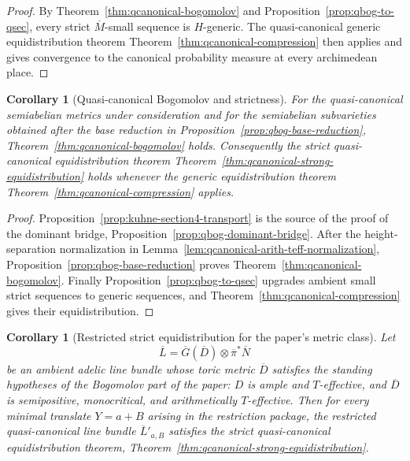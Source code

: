 \documentclass[10pt,a4paper]{amsart}
\theoremstyle{plain}
\newtheorem{corollary}[theorem]{Corollary}
\theoremstyle{plain}
\numberwithin{equation}{section}
\providecommand{\bD}{\overline{D}}
\providecommand{\bL}{\overline{L}}
\providecommand{\bN}{\overline{N}}
\providecommand{\bM}{\overline{M}}
\begin{document}
\begin{proof}
	By Theorem~\ref{thm:qcanonical-bogomolov} and
	Proposition~\ref{prop:qbog-to-qsec}, every strict \(\bM\)-small sequence is
	\(H\)-generic.  The quasi-canonical generic equidistribution theorem
	Theorem~\ref{thm:qcanonical-compression} then applies and gives convergence to
	the canonical probability measure at every archimedean place.
\end{proof}

\begin{corollary}[Quasi-canonical Bogomolov and strictness]
	\label{cor:kuhne-transport-qbog-qsec}
	For the quasi-canonical semiabelian metrics under consideration and for the
	semiabelian subvarieties obtained after the base reduction in
	Proposition~\ref{prop:qbog-base-reduction},
	Theorem~\ref{thm:qcanonical-bogomolov} holds.  Consequently the strict
	quasi-canonical equidistribution theorem
	Theorem~\ref{thm:qcanonical-strong-equidistribution} holds whenever the
	generic equidistribution theorem Theorem~\ref{thm:qcanonical-compression}
	applies.
\end{corollary}

\begin{proof}
	Proposition~\ref{prop:kuhne-section4-transport} is the source of the proof of
	the dominant bridge, Proposition~\ref{prop:qbog-dominant-bridge}.  After the
	height-separation normalization in
	Lemma~\ref{lem:qcanonical-arith-teff-normalization},
	Proposition~\ref{prop:qbog-base-reduction} proves
	Theorem~\ref{thm:qcanonical-bogomolov}.  Finally
	Proposition~\ref{prop:qbog-to-qsec} upgrades ambient small strict sequences to
	generic sequences, and Theorem~\ref{thm:qcanonical-compression} gives their
	equidistribution.
\end{proof}

\begin{corollary}[Restricted strict equidistribution for the paper's metric class]
	\label{cor:kuhne-transport-paper-metric-class}
	Let
	\[
	\bL=\overline G(\bD)\otimes\overline\pi^*\bN
	\]
	be an ambient adelic line bundle whose toric metric \(\bD\) satisfies the
	standing hypotheses of the Bogomolov part of the paper:
	\(D\) is ample and \(T\)-effective, and \(\bD\) is semipositive, monocritical,
	and arithmetically \(T\)-effective.  Then for every minimal translate
	\(Y=a+B\) arising in the restriction package, the restricted
	quasi-canonical line bundle \(\bL'_{a,B}\) satisfies the strict
	quasi-canonical equidistribution theorem,
	Theorem~\ref{thm:qcanonical-strong-equidistribution}.
\end{corollary}
\end{document}

